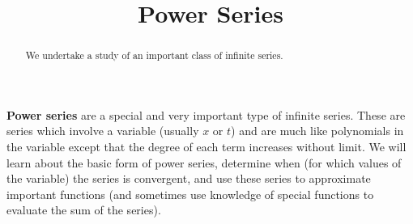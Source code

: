 \documentclass{ximera}
\title{Power Series}
\begin{document}
\begin{abstract}
We undertake a study of an important class of infinite series.
\end{abstract}
\maketitle

\textbf{Power series} are a special and very important type of infinite series. These are series which involve a variable (usually $x$ or $t$) and are much like polynomials in the variable except that the degree of each term increases without limit. We will learn about the basic form of power series, determine when (for which values of the variable) the series is convergent, and use these series to approximate important functions (and sometimes use knowledge of special functions to evaluate the sum of the series).
\end{document}
